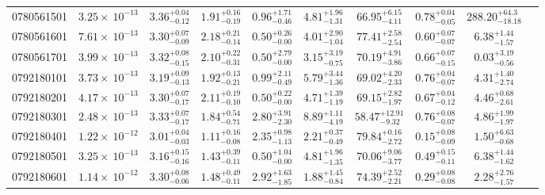 \documentclass{article}
\begin{document}
\begin{landscape}
\begin{longtable}{cccccccccl}
0780561501 & $3.25 \times~10^{-13}$ & $3.36^{+0.04}_{-0.12}$ & $1.91^{+0.16}_{-0.19}$ & $0.96^{+1.71}_{-0.46}$ & $4.81^{+1.96}_{-1.31}$ & $66.95^{+6.15}_{-4.11}$ &  $0.78^{+0.04}_{-0.05}$ &  $288.20^{+64.3}_{-18.18}$  \\
0780561601 & $7.61 \times~10^{-13}$ & $3.30^{+0.07}_{-0.09}$ & $2.18^{+0.21}_{-0.14}$ & $0.50^{+0.26}_{-0.00}$ & $4.01^{+2.90}_{-1.04}$ & $77.41^{+2.58}_{-2.54}$ &  $0.60^{+0.07}_{-0.07}$ &  $6.38^{+1.44}_{-1.57}$  \\
0780561701 & $3.99 \times~10^{-13}$ & $3.32^{+0.08}_{-0.15}$ & $2.10^{+0.22}_{-0.31}$ & $0.50^{+2.79}_{-0.00}$ & $3.15^{+3.19}_{-0.75}$ & $70.19^{+4.91}_{-3.86}$ &  $0.66^{+0.07}_{-0.15}$ &  $0.03^{+3.19}_{-0.56}$  \\
0792180101 & $3.73 \times~10^{-13}$ & $3.19^{+0.09}_{-0.13}$ & $1.92^{+0.13}_{-0.21}$ & $0.99^{+2.11}_{-0.49}$ & $5.79^{+3.44}_{-1.36}$ & $69.02^{+4.20}_{-2.33}$ &  $0.76^{+0.04}_{-0.07}$ &  $4.31^{+1.40}_{-2.74}$  \\
0792180201 & $4.17 \times~10^{-13}$ & $3.30^{+0.07}_{-0.17}$ & $2.11^{+0.19}_{-0.10}$ & $0.50^{+0.22}_{-0.00}$ & $4.71^{+1.39}_{-1.19}$ & $69.15^{+2.82}_{-1.97}$ &  $0.67^{+0.04}_{-0.12}$ &  $4.46^{+0.68}_{-2.61}$  \\
0792180301 & $2.48 \times~10^{-13}$ & $3.33^{+0.07}_{-0.17}$ & $1.84^{+0.54}_{-0.71}$ & $2.80^{+3.91}_{-2.30}$ & $8.89^{+1.11}_{-4.19}$ & $58.47^{+12.91}_{-9.32}$ &  $0.76^{+0.08}_{-0.07}$ &  $4.86^{+1.99}_{-1.97}$  \\
0792180401 & $1.22 \times~10^{-12}$ & $3.01^{+0.04}_{-0.03}$ & $1.11^{+0.16}_{-0.08}$ & $2.35^{+0.98}_{-1.13}$ & $2.21^{+0.37}_{-0.49}$ & $79.84^{+0.16}_{-2.72}$ &  $0.15^{+0.08}_{-0.09}$ &  $1.50^{+6.63}_{-0.68}$  \\ 
0792180501 & $3.25 \times~10^{-13}$ & $3.16^{+0.15}_{-0.16}$ & $1.43^{+0.39}_{-0.11}$ & $0.50^{+1.04}_{-0.00}$ & $4.81^{+1.96}_{-1.35}$ & $70.06^{+9.06}_{-3.77}$ &  $0.49^{+0.15}_{-0.11}$ &  $6.38^{+1.44}_{-1.62}$  \\
0792180601 & $1.14 \times~10^{-12}$ & $3.30^{+0.08}_{-0.06}$ & $1.48^{+0.49}_{-0.11}$ & $2.92^{+1.63}_{-1.85}$ & $1.88^{+1.45}_{-0.84}$ & $74.39^{+2.52}_{-2.21}$ &  $0.29^{+0.08}_{-0.08}$ &  $2.28^{+2.76}_{-1.57}$  \\
\end{longtable}

\end{landscape}
\end{document}
